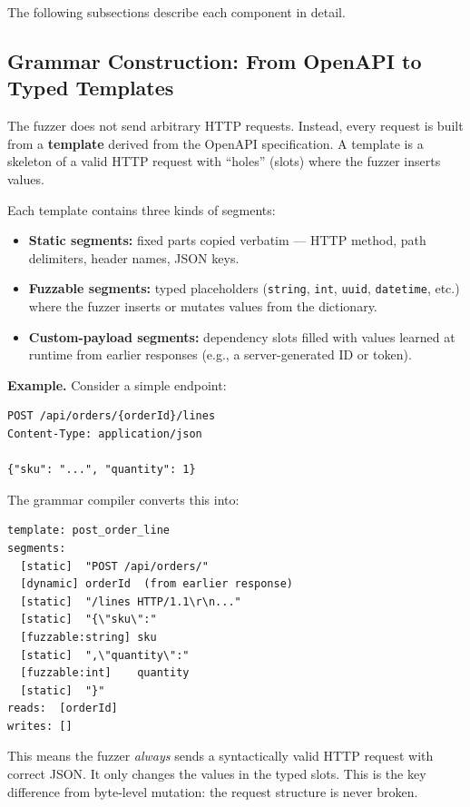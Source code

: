 \documentclass[conference]{IEEEtran}
\begin{document}
The following subsections describe each component in detail.

\subsection{Grammar Construction: From OpenAPI to Typed Templates}
\label{sec:grammar_model}

The fuzzer does not send arbitrary HTTP requests. Instead, every request is built from a \textbf{template} derived from the OpenAPI specification. A template is a skeleton of a valid HTTP request with ``holes'' (slots) where the fuzzer inserts values.

Each template contains three kinds of segments:
\begin{itemize}
    \item \textbf{Static segments:} fixed parts copied verbatim --- HTTP method, path delimiters, header names, JSON keys.
    \item \textbf{Fuzzable segments:} typed placeholders (\texttt{string}, \texttt{int}, \texttt{uuid}, \texttt{datetime}, etc.) where the fuzzer inserts or mutates values from the dictionary.
    \item \textbf{Custom-payload segments:} dependency slots filled with values learned at runtime from earlier responses (e.g., a server-generated ID or token).
\end{itemize}

\textbf{Example.} Consider a simple endpoint:
\begin{lstlisting}
POST /api/orders/{orderId}/lines
Content-Type: application/json

{"sku": "...", "quantity": 1}
\end{lstlisting}

The grammar compiler converts this into:
\begin{lstlisting}
template: post_order_line
segments:
  [static]  "POST /api/orders/"
  [dynamic] orderId  (from earlier response)
  [static]  "/lines HTTP/1.1\r\n..."
  [static]  "{\"sku\":"
  [fuzzable:string] sku
  [static]  ",\"quantity\":"
  [fuzzable:int]    quantity
  [static]  "}"
reads:  [orderId]
writes: []
\end{lstlisting}

This means the fuzzer \emph{always} sends a syntactically valid HTTP request with correct JSON. It only changes the values in the typed slots. This is the key difference from byte-level mutation: the request structure is never broken.
\end{document}
